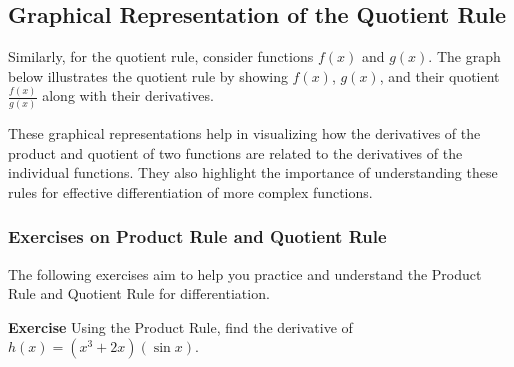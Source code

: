 \documentclass[a4paper,12pt]{book}
\newenvironment{exercise}[1][]
  {\par\medskip\noindent\textbf{Exercise #1} \rmfamily}
  {\medskip}
\newcounter{example}
\begin{document}
\subsection{Graphical Representation of the Quotient Rule}
Similarly, for the quotient rule, consider functions \( f(x) \) and \( g(x) \). The graph below illustrates the quotient rule by showing \( f(x) \), \( g(x) \), and their quotient \( \frac{f(x)}{g(x)} \) along with their derivatives.


\begin{center}
\end{center}

These graphical representations help in visualizing how the derivatives of the product and quotient of two functions are related to the derivatives of the individual functions. They also highlight the importance of understanding these rules for effective differentiation of more complex functions.

\subsubsection*{Exercises on Product Rule and Quotient Rule}

The following exercises aim to help you practice and understand the Product Rule and Quotient Rule for differentiation.

\begin{exercise}
Using the Product Rule, find the derivative of \( h(x) = (x^3 + 2x)(\sin x) \).
\end{exercise}
\end{document}
